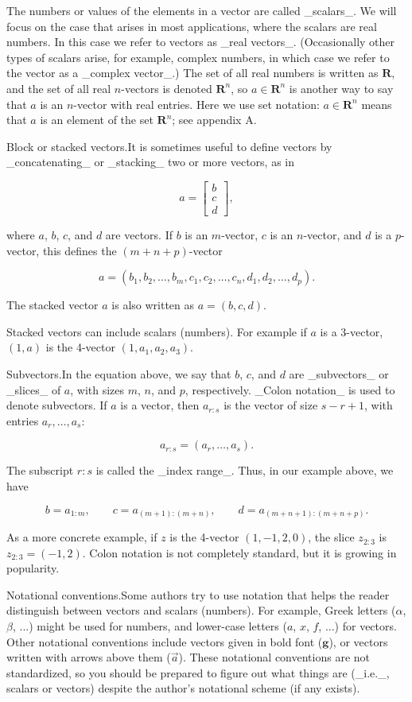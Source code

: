 The numbers or values of the elements in a vector are called _scalars_. We will focus on the case that arises in most applications, where the scalars are real numbers. In this case we refer to vectors as _real vectors_. (Occasionally other types of scalars arise, for example, complex numbers, in which case we refer to the vector as a _complex vector_.) The set of all real numbers is written as \(\mathbf{R}\), and the set of all real \(n\)-vectors is denoted \(\mathbf{R}^{n}\), so \(a\in\mathbf{R}^{n}\) is another way to say that \(a\) is an \(n\)-vector with real entries. Here we use set notation: \(a\in\mathbf{R}^{n}\) means that \(a\) is an element of the set \(\mathbf{R}^{n}\); see appendix A.

Block or stacked vectors.It is sometimes useful to define vectors by _concatenating_ or _stacking_ two or more vectors, as in

\[a=\left[\begin{array}{c}b\\ c\\ d\end{array}\right],\]

where \(a\), \(b\), \(c\), and \(d\) are vectors. If \(b\) is an \(m\)-vector, \(c\) is an \(n\)-vector, and \(d\) is a \(p\)-vector, this defines the \((m+n+p)\)-vector

\[a=(b_{1},b_{2},\dots,b_{m},c_{1},c_{2},\dots,c_{n},d_{1},d_{2},\dots,d_{p}).\]

The stacked vector \(a\) is also written as \(a=(b,c,d)\).

Stacked vectors can include scalars (numbers). For example if \(a\) is a 3-vector, \((1,a)\) is the 4-vector \((1,a_{1},a_{2},a_{3})\).

Subvectors.In the equation above, we say that \(b\), \(c\), and \(d\) are _subvectors_ or _slices_ of \(a\), with sizes \(m\), \(n\), and \(p\), respectively. _Colon notation_ is used to denote subvectors. If \(a\) is a vector, then \(a_{r:s}\) is the vector of size \(s-r+1\), with entries \(a_{r},\dots,a_{s}\):

\[a_{r:s}=(a_{r},\dots,a_{s}).\]

The subscript \(r\!:\!s\) is called the _index range_. Thus, in our example above, we have

\[b=a_{1:m},\qquad c=a_{(m+1):(m+n)},\qquad d=a_{(m+n+1):(m+n+p)}.\]

As a more concrete example, if \(z\) is the 4-vector \((1,-1,2,0)\), the slice \(z_{2:3}\) is \(z_{2:3}=(-1,2)\). Colon notation is not completely standard, but it is growing in popularity.

Notational conventions.Some authors try to use notation that helps the reader distinguish between vectors and scalars (numbers). For example, Greek letters (\(\alpha\), \(\beta\), ...) might be used for numbers, and lower-case letters (\(a\), \(x\), \(f\), ...) for vectors. Other notational conventions include vectors given in bold font (\(\mathbf{g}\)), or vectors written with arrows above them (\(\vec{a}\)). These notational conventions are not standardized, so you should be prepared to figure out what things are (_i.e._, scalars or vectors) despite the author's notational scheme (if any exists).

 